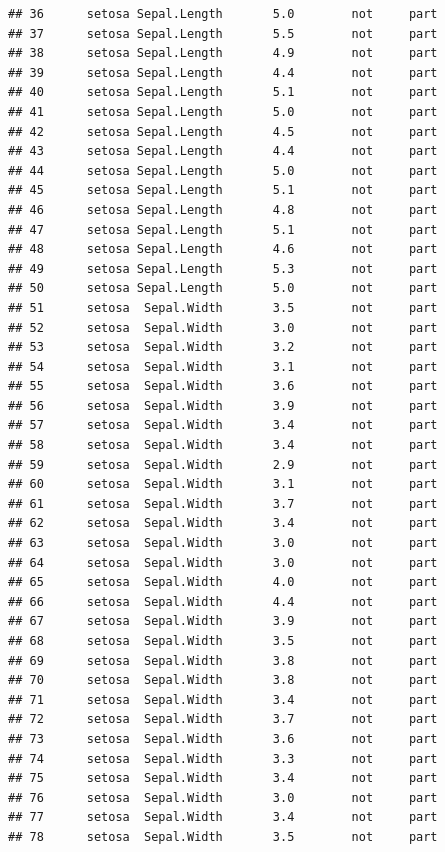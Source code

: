 \documentclass[krantz2]{krantz}\usepackage{knitr}%
\begin{document}
\begin{knitrout}
\begin{kframe}
\begin{verbatim}
## 36      setosa Sepal.Length       5.0        not     part
## 37      setosa Sepal.Length       5.5        not     part
## 38      setosa Sepal.Length       4.9        not     part
## 39      setosa Sepal.Length       4.4        not     part
## 40      setosa Sepal.Length       5.1        not     part
## 41      setosa Sepal.Length       5.0        not     part
## 42      setosa Sepal.Length       4.5        not     part
## 43      setosa Sepal.Length       4.4        not     part
## 44      setosa Sepal.Length       5.0        not     part
## 45      setosa Sepal.Length       5.1        not     part
## 46      setosa Sepal.Length       4.8        not     part
## 47      setosa Sepal.Length       5.1        not     part
## 48      setosa Sepal.Length       4.6        not     part
## 49      setosa Sepal.Length       5.3        not     part
## 50      setosa Sepal.Length       5.0        not     part
## 51      setosa  Sepal.Width       3.5        not     part
## 52      setosa  Sepal.Width       3.0        not     part
## 53      setosa  Sepal.Width       3.2        not     part
## 54      setosa  Sepal.Width       3.1        not     part
## 55      setosa  Sepal.Width       3.6        not     part
## 56      setosa  Sepal.Width       3.9        not     part
## 57      setosa  Sepal.Width       3.4        not     part
## 58      setosa  Sepal.Width       3.4        not     part
## 59      setosa  Sepal.Width       2.9        not     part
## 60      setosa  Sepal.Width       3.1        not     part
## 61      setosa  Sepal.Width       3.7        not     part
## 62      setosa  Sepal.Width       3.4        not     part
## 63      setosa  Sepal.Width       3.0        not     part
## 64      setosa  Sepal.Width       3.0        not     part
## 65      setosa  Sepal.Width       4.0        not     part
## 66      setosa  Sepal.Width       4.4        not     part
## 67      setosa  Sepal.Width       3.9        not     part
## 68      setosa  Sepal.Width       3.5        not     part
## 69      setosa  Sepal.Width       3.8        not     part
## 70      setosa  Sepal.Width       3.8        not     part
## 71      setosa  Sepal.Width       3.4        not     part
## 72      setosa  Sepal.Width       3.7        not     part
## 73      setosa  Sepal.Width       3.6        not     part
## 74      setosa  Sepal.Width       3.3        not     part
## 75      setosa  Sepal.Width       3.4        not     part
## 76      setosa  Sepal.Width       3.0        not     part
## 77      setosa  Sepal.Width       3.4        not     part
## 78      setosa  Sepal.Width       3.5        not     part

\end{verbatim}
\end{kframe}
\end{knitrout}
\end{document}
